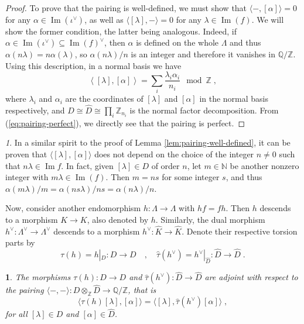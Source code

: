 \documentclass[11pt,english]{amsart}
\numberwithin{equation}{section}
\numberwithin{figure}{section}
\theoremstyle{plain}
\newtheorem{prop}[thm]{\protect\propositionname}
\theoremstyle{plain}
\theoremstyle{definition}
\theoremstyle{remark}
\newtheorem{rem}[thm]{\protect\remarkname}
\DeclareMathOperator{\image}{Im}
\newcommand{\ZZ}{\mathbb{Z}}
\newcommand{\NN}{\mathbb{N}}
\newcommand{\QQ}{\mathbb{Q}}
\providecommand{\propositionname}{Proposition}
\providecommand{\remarkname}{Remark}
\begin{document}
\begin{proof}
To prove that the pairing is well-defined, we must show that $\langle -, [\alpha]\rangle = 0$ for any $\alpha \in \image(\iota^\vee)$, as well as $\langle [\lambda], -\rangle = 0$ for any $\lambda \in \image(f)$. We will show the former condition, the latter being analogous. Indeed, if $\alpha \in \image(\iota^\vee) \subseteq \image(f)^\vee$, then $\alpha$ is defined on the whole $\Lambda$ and thus $\alpha(n\lambda)=n\alpha(\lambda)$, so $\alpha(n\lambda)/n$ is an integer and therefore it vanishes in $\QQ/\ZZ$. Using this description, in a normal basis we have
\begin{equation}\label{eq:pairing-perfect}
    \left\langle [\lambda], [\alpha]\right\rangle = \sum_i \frac{\lambda_i \alpha_i}{n_i} \mod \ZZ\; ,
\end{equation}
where $\lambda_i$ and $\alpha_i$ are the coordinates of $[\lambda]$ and $[\alpha]$ in the normal basis respectively, and $D \cong \hat{D} \cong \prod_i \ZZ_{n_i}$ is the normal factor decomposition. From (\ref{eq:pairing-perfect}), we directly see that the pairing is perfect.
\end{proof}

\begin{rem}
In a similar spirit to the proof of Lemma \ref{lem:pairing-well-defined}, it can be proven that $\langle[\lambda],[\alpha]\rangle$ does not depend on the choice of the integer $n \neq 0$ such that $n\lambda \in \image{f}$. In fact, given $[\lambda] \in D$ of order $n$, let $m \in \NN$ be another nonzero integer with $m\lambda \in \image(f)$. Then $m = ns$ for some integer $s$, and thus $\alpha(m\lambda)/m=\alpha(ns\lambda)/ns = \alpha(n\lambda)/n$.
\end{rem}

Now, consider another endomorphism $h: \Lambda \to \Lambda$ with $hf=fh$. Then $h$ descends to a morphism $K\to K$, also denoted by $h$. Similarly, the dual morphism $h^\vee: \Lambda^\vee \to \Lambda^\vee$ descends to a morphism $h^\vee: \hat{K} \to \hat{K}$. Denote their respective torsion parts by
$$
    \tau(h) = h|_D: D \to D\quad , \quad
    \hat{\tau}(h^\vee) = h^\vee|_{\hat{D}}: \hat{D} \to \hat{D}\; .
$$


\begin{prop}
    The morphisms $\tau(h): D \to D$ and $\hat{\tau}(h^\vee): \hat{D} \to \hat{D}$ are adjoint with respect to the pairing $\langle-, -\rangle: D \otimes_\ZZ \hat{D} \to \QQ/\ZZ$, that is
    $$
        \langle \tau(h)[\lambda], [\alpha]\rangle = \langle [\lambda], \hat{\tau}(h^\vee)[\alpha]\rangle\; ,
    $$
    for all $[\lambda] \in D$ and $[\alpha] \in \hat{D}$.
\end{prop}
\end{document}
